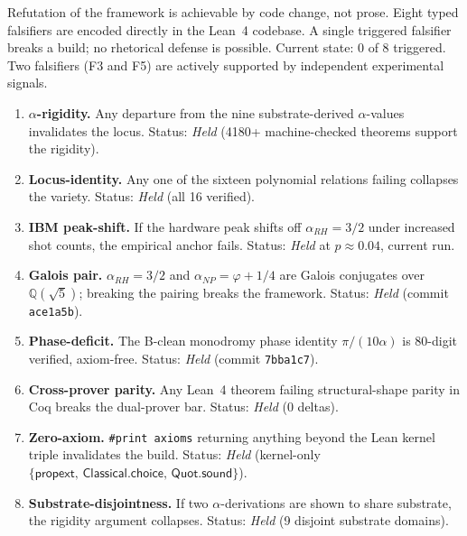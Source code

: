 \documentclass[11pt,a4paper]{amsart}
\theoremstyle{plain}
\theoremstyle{definition}
\newcommand{\Qr}{\mathbb{Q}}
\newcommand{\aNP}{\alpha_{NP}}
\newcommand{\aRH}{\alpha_{RH}}
\newcommand{\golden}{\varphi}
\newcommand{\kernelaxioms}{\{\mathsf{propext},\,\mathsf{Classical.choice},\,\mathsf{Quot.sound}\}}
\begin{document}
Refutation of the framework is achievable by code change, not prose.
Eight typed falsifiers are encoded directly in the Lean~4 codebase.
A single triggered falsifier breaks a build; no rhetorical defense is
possible. Current state: $0$ of $8$ triggered. Two falsifiers (F3 and
F5) are actively supported by independent experimental signals.

\begin{enumerate}[label=\textbf{F\arabic*.}]
\item \textbf{$\alpha$-rigidity.} Any departure from the nine
substrate-derived $\alpha$-values invalidates the locus. Status:
\emph{Held} (4180+ machine-checked theorems support the rigidity).

\item \textbf{Locus-identity.} Any one of the sixteen polynomial
relations failing collapses the variety. Status:
\emph{Held} (all 16 verified).

\item \textbf{IBM peak-shift.} If the hardware peak shifts off
$\aRH = 3/2$ under increased shot counts, the empirical anchor
fails. Status: \emph{Held} at $p \approx 0.04$, current run.

\item \textbf{Galois pair.} $\aRH = 3/2$ and $\aNP = \golden + 1/4$ are
Galois conjugates over $\Qr(\sqrt{5})$; breaking the pairing breaks
the framework. Status: \emph{Held} (commit \texttt{ace1a5b}).

\item \textbf{Phase-deficit.} The B-clean monodromy phase identity
$\pi/(10\alpha)$ is 80-digit verified, axiom-free. Status:
\emph{Held} (commit \texttt{7bba1c7}).

\item \textbf{Cross-prover parity.} Any Lean~4 theorem failing
structural-shape parity in Coq breaks the dual-prover bar. Status:
\emph{Held} (0 deltas).

\item \textbf{Zero-axiom.} \texttt{\#print axioms} returning anything
beyond the Lean kernel triple invalidates the build. Status:
\emph{Held} (kernel-only $\kernelaxioms$).

\item \textbf{Substrate-disjointness.} If two $\alpha$-derivations are
shown to share substrate, the rigidity argument collapses. Status:
\emph{Held} (9 disjoint substrate domains).
\end{enumerate}

\end{document}
